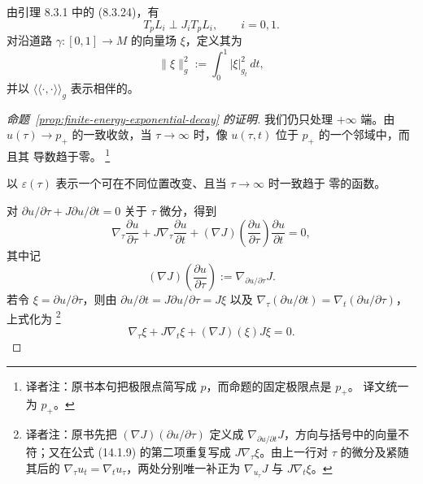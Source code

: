 由引理 8.3.1 中的 (8.3.24)，有\termOrthogonalityCondition{}
\begin{equation}
  T_pL_i\perp J_iT_pL_i,
  \qquad i=0,1.
\label{eq:lagrangian-boundary-orthogonality}
\end{equation}
对沿道路 $\gamma:[0,1]\to M$ 的向量场 $\xi$，定义其\termLtwoNorm{}为
\[
  \|\xi\|_g^2:=\int_0^1|\xi|_{g_t}^2\,dt,
\]
并以 $\langle\!\langle\mathord\cdot,\mathord\cdot\rangle\!\rangle_g$
表示相伴的\termLtwoInnerProduct{}。

\begin{proof}[命题~\ref{prop:finite-energy-exponential-decay} 的证明]
我们仍只处理 $+\infty$ 端。由 $u(\tau)\to p_+$ 的一致收敛，当
$\tau\to\infty$ 时，像 $u(\tau,t)$ 位于 $p_+$ 的一个\personDarboux{}邻域中，而且其
导数趋于零。
\footnote{译者注：原书本句把极限点简写成 $p$，而命题的固定极限点是 $p_+$。
译文统一为 $p_+$。}

以 $\varepsilon(\tau)$ 表示一个可在不同位置改变、且当 $\tau\to\infty$ 时一致趋于
零的函数。

对 $\partial u/\partial\tau+J\partial u/\partial t=0$ 关于 $\tau$ 微分，得到
\[
  \nabla_\tau\frac{\partial u}{\partial\tau}
  +J\nabla_\tau\frac{\partial u}{\partial t}
  +(\nabla J)\left(\frac{\partial u}{\partial\tau}\right)
    \frac{\partial u}{\partial t}
  =0,
\]
其中记
\[
  (\nabla J)\left(\frac{\partial u}{\partial\tau}\right)
  :=\nabla_{\partial u/\partial\tau}J.
\]
若令 $\xi=\partial u/\partial\tau$，则由
$\partial u/\partial t=J\partial u/\partial\tau=J\xi$ 以及
$\nabla_\tau(\partial u/\partial t)=\nabla_t(\partial u/\partial\tau)$，上式化为
\footnote{译者注：原书先把
$(\nabla J)(\partial u/\partial\tau)$ 定义成
$\nabla_{\partial u/\partial t}J$，方向与括号中的向量不符；又在公式 (14.1.9)
的第二项重复写成 $J\nabla_\tau\xi$。由上一行对 $\tau$ 的微分及紧随其后的
$\nabla_\tau u_t=\nabla_tu_\tau$，两处分别唯一补正为
$\nabla_{u_\tau}J$ 与 $J\nabla_t\xi$。}
\begin{equation}
  \nabla_\tau\xi
  +J\nabla_t\xi
  +(\nabla J)(\xi)J\xi
  =0.
\label{eq:differentiated-floer-xi}
\end{equation}


\end{proof}
